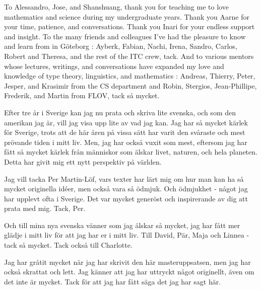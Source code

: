 \documentclass[11pt, a4paper]{article}
\begin{document}
To Alessandro, Jose, and Shanshuang, thank you for teaching me to love
mathematics and science during my undergraduate years. Thank you Aarne for your
time, patience, and conversations. Thank you Inari for your endless support and
insight. To the many friends and colleagues I've had the pleasure to know and learn
from in Göteborg : Ayberk, Fabian, Nachi, Irena, Sandro, Carlos, Robert and
Theresa, and the rest of the ITC crew, tack. And to various mentors whose
lectures, writings, and conversations have expanded my love and knowledge of
type theory, linguistics, and mathematics : Andreas, Thierry, Peter, Jesper, and
Krasimir from the CS department and Robin, Stergios, Jean-Phillipe, Frederik,
and Martin from FLOV, tack så mycket.

Efter tre år i Sverige kan jag nu prata och skriva lite svenska, och som den
amerikan jag är, vill jag visa upp lite av vad jag kan. Jag har så mycket kärlek
för Sverige, trots att de här åren på vissa sätt har varit den svåraste och mest
prövande tiden i mitt liv. Men, jag har också vuxit som mest, eftersom jag har
fått så mycket kärlek från människor som älskar livet, naturen, och hela
planeten. Detta har givit mig ett nytt perspektiv på världen.

Jag vill tacka Per Martin-Löf, vars texter har lärt mig om hur man kan ha så
mycket originella idéer, men också vara så ödmjuk. Och ödmjukhet - något jag har
upplevt ofta i Sverige. Det var mycket generöst och inspirerande av dig att
prata med mig. Tack, Per.

Och till mina nya svenska vänner som jag älskar så mycket, jag har fått mer
glädje i mitt liv för att jag har er i mitt liv. Till David, Pär, Maja och
Linnea - tack så mycket. Tack också till Charlotte.

Jag har gråtit mycket när jag har skrivit den här masteruppsatsen, men jag har
också skrattat och lett. Jag känner att jag har uttryckt något originellt, även
om det inte är mycket. Tack för att jag har fått säga det jag har sagt här.

\thispagestyle{empty}

\newpage
\begin{spacing}{0.0}
\tableofcontents
\end{spacing}

\thispagestyle{empty}

\newpage
\setcounter{page}{1}
\end{document}

